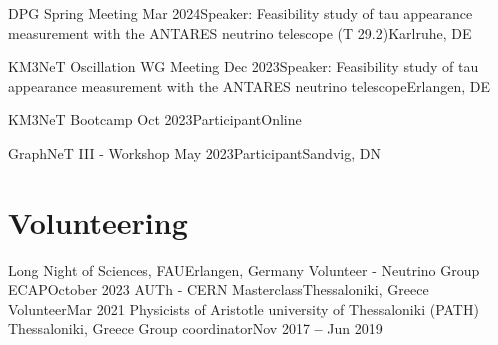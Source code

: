 \documentclass[letterpaper,11pt]{article}
\begin{document}
{      \resumeSubheading
      {DPG Spring Meeting}
      {Mar 2024}{Speaker: Feasibility study of tau appearance measurement with the ANTARES neutrino telescope (T 29.2)}{Karlruhe, DE}

      \resumeSubheading
      {KM3NeT Oscillation WG Meeting}
      {Dec 2023}{Speaker: Feasibility study of tau appearance measurement with the ANTARES neutrino telescope}{Erlangen, DE}

      \resumeSubheading
      {KM3NeT Bootcamp}
      {Oct 2023}{Participant}{Online}
      
      \resumeSubheading
      {GraphNeT III - Workshop}
      {May 2023}{Participant}{Sandvig, DN}
\resumeSubHeadingListEnd




    
    

\section{Volunteering}
    \resumeSubHeadingListStart
    \resumeSubheading
      {Long Night of Sciences, FAU}{Erlangen, Germany}
      {Volunteer - Neutrino Group ECAP}{October 2023}
        \resumeItemListStart
        \resumeItemListEnd
        \resumeSubheading
      {AUTh - CERN Masterclass}{Thessaloniki, Greece}
      {Volunteer}{Mar 2021}
        \resumeItemListStart
        \resumeItemListEnd
    \resumeSubheading
      {Physicists of Aristotle university of Thessaloniki (PATH) }{Thessaloniki, Greece}
      {Group coordinator}{Nov 2017 \textbf{--} Jun 2019}
        \resumeItemListStart
    \resumeItemListEnd    
    \resumeSubHeadingListEnd


}
\end{document}
